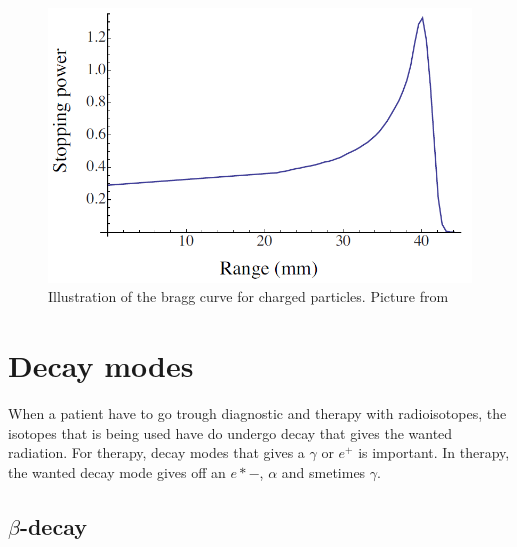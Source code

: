 \documentclass[twoside,english]{uiofysmaster/uiofysmaster}
\begin{document}
\begin{figure}[h!]
    \centering
    \includegraphics[scale=.25]{bragg.png}
    \caption{Illustration of the bragg curve for charged particles. Picture from \cite{inbook}}
    \label{fig:braggcurve}
\end{figure}


 
\section{Decay modes}
\label{sec:decaymodes}

When a patient have to go trough diagnostic and therapy with radioisotopes, the isotopes that is being used have do undergo decay that gives the wanted radiation. For therapy, decay modes  that gives a $\gamma$ or $e^{+}$ is important. In therapy, the wanted decay mode gives off an $e*{-}$, $\alpha$ and smetimes $\gamma$.

\subsection{$\beta$-decay}
\end{document}
